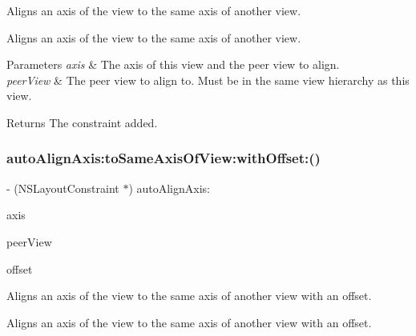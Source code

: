 Aligns an axis of the view to the same axis of another view.

Aligns an axis of the view to the same axis of another view.


\begin{DoxyParams}{Parameters}
{\em axis} & The axis of this view and the peer view to align. \\
\hline
{\em peer\+View} & The peer view to align to. Must be in the same view hierarchy as this view. \\
\hline
\end{DoxyParams}
\begin{DoxyReturn}{Returns}
The constraint added. 
\end{DoxyReturn}
\mbox{\label{category_u_i_view_07_auto_layout_08_ab6372904858a1246f42a39596043d085}} 
\subsubsection{\texorpdfstring{auto\+Align\+Axis\+:to\+Same\+Axis\+Of\+View\+:with\+Offset\+:()}{autoAlignAxis:toSameAxisOfView:withOffset:()}}
{\footnotesize\ttfamily -\/ (N\+S\+Layout\+Constraint $\ast$) auto\+Align\+Axis\+: \begin{DoxyParamCaption}\item[{(A\+L\+Axis)}]{axis }\item[{toSameAxisOfView:(U\+I\+View $\ast$)}]{peer\+View }\item[{withOffset:(C\+G\+Float)}]{offset }\end{DoxyParamCaption}}

Aligns an axis of the view to the same axis of another view with an offset.

Aligns an axis of the view to the same axis of another view with an offset.


